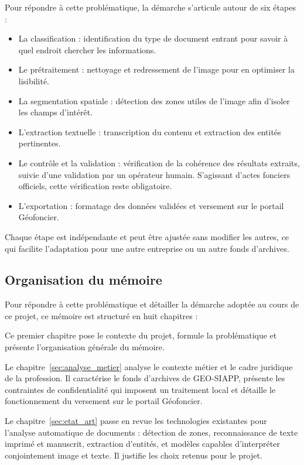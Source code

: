 Pour répondre à cette problématique, la démarche s'articule autour de six étapes :

\begin{itemize}
    \item La classification : identification du type de document entrant pour savoir à quel endroit chercher les informations.
    \item Le prétraitement : nettoyage et redressement de l'image pour en optimiser la lisibilité.
    \item La segmentation spatiale : détection des zones utiles de l'image afin d'isoler les champs d'intérêt.
    \item L'extraction textuelle : transcription du contenu et extraction des entités pertinentes.
    \item Le contrôle et la validation : vérification de la cohérence des résultats extraits, suivie d'une validation par un opérateur humain. S'agissant d'actes fonciers officiels, cette vérification reste obligatoire.
    \item L'exportation : formatage des données validées et versement sur le portail Géofoncier.
\end{itemize}

Chaque étape est indépendante et peut être ajustée sans modifier les autres, ce qui facilite l'adaptation pour une autre entreprise ou un autre fonds d'archives.


\subsection{Organisation du mémoire}


Pour répondre à cette problématique et détailler la démarche adoptée au cours de ce projet, ce mémoire est structuré en huit chapitres :

Ce premier chapitre pose le contexte du projet, formule la problématique et présente l'organisation générale du mémoire.

Le chapitre~\ref{sec:analyse_metier} analyse le contexte métier et le cadre juridique de la profession. Il caractérise le fonds d'archives de GEO-SIAPP, présente les contraintes de confidentialité qui imposent un traitement local et détaille le fonctionnement du versement sur le portail Géofoncier.

Le chapitre~\ref{sec:etat_art} passe en revue les technologies existantes pour l'analyse automatique de documents : détection de zones, reconnaissance de texte imprimé et manuscrit, extraction d'entités, et modèles capables d'interpréter conjointement image et texte. Il justifie les choix retenus pour le projet.

